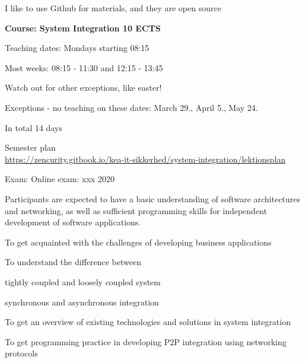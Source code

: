 \documentclass[Screen16to9,17pt]{foils}
\begin{document}
\vskip 1cm

\centerline{I like to use Github for materials, and they are open source}





{\Large\bf Course: System Integration 10 ECTS}

Teaching dates: Mondays starting 08:15

\begin{list2}
\item Most weeks: 08:15 - 11:30 and 12:15 - 13:45
\item Watch out for other exceptions, like easter!
\item Exceptions - no teaching on these dates: March 29., April 5., May 24.
\end{list2}

In total 14 days

Semester plan\\
\url{https://zencurity.gitbook.io/kea-it-sikkerhed/system-integration/lektionsplan}

Exam: Online exam: xxx 2020




Participants are expected to have a basic understanding of software architectures and networking, as well as sufficient
programming skills for independent development of software applications.




\begin{list1}
\item To get acquainted with the challenges of developing business applications
\item To understand the difference between
\begin{list2}
\item tightly coupled and loosely coupled system
\item synchronous and asynchronous integration
\end{list2}
\item To get an overview of existing technologies and solutions in system integration
\item To get programming practice in developing P2P integration using networking
protocols
\end{list1}
\end{document}
